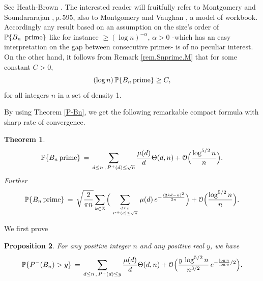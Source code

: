 \documentclass[11pt,draft,reqno]{amsart}
\newtheorem{theorem}{Theorem}[section]
\newtheorem{proposition}[theorem]{Proposition}
\theoremstyle{definition}
\theoremstyle{remarks}
\numberwithin{equation}{section}
\def \a{{\alpha}}
\def \b{{\beta}}
\def \g{{\gamma}}
\def \m{{\mu}}
\def\P{{\mathcal P}}
\def\P{{\mathbb P}}
\def\Z{{\mathbb Z}}
\begin{document}
See Heath-Brown \cite{HB}.
The interested reader will fruitfully refer to Montgomery and Soundararajan \cite{MS},\,p.\,595, also to Montgomery and Vaughan \cite{MV}, a model of   workbook. Accordingly any  result based on an assumption on the size's order of $\P\{ B_n\,\hbox{  prime} \}$ like for instance $\ge ( \log n)^{-\a}$, $\a>0$  -which has an easy interpretation on the gap between consecutive primes- is of no peculiar interest.
\vskip 3pt On the other hand, it follows from Remark \ref{rem.Snprime.M}   that  for some constant $C>0$,
\begin{equation}\label{bd1}(\log n) \, \P\{ B_n\,\hbox{prime} \}\ge C,
\end{equation}
for all   integers $n$ in a  set  of density 1.  \bigskip \par
  
  
  
 By using Theorem \ref{P-Bn}, we get  the following remarkable compact formula with sharp rate of convergence. 
\begin{theorem}\label{eta(n;y)Bprime}
 \begin{equation*}\P\{ B_n\,\hbox{\rm prime} \} \,=\,  \sum_{d\le n\,,\,  P^+(d )\le \sqrt n}{  \m(d)\over d}\Theta(d,n)+ {\mathcal O}\Big({ \log^{5/2} n  \over n}\Big).\end{equation*} 
 Further
\begin{equation*}\P\{ B_n\,\hbox{\rm prime} \} \,=\, \sqrt{  { 2\over \pi
n}}  \sum_{ k\in\Z}  \Big( \sum_{d\le n\atop  P^+(d )\le \sqrt n}   \m(d) \,e^{-{ (2kd-n)^2\over 2 n}}\Big)+ {\mathcal O}\Big({ \log^{5/2} n  \over n}\Big).\end{equation*} 
\end{theorem}  
We first prove
\begin{proposition} \label{p.eta(n;y)B}  For any positive integer $n$ and any positive real $y$,
 we have 
  \begin{equation}\label{eta(n;y)B.est}\P\{P^-(B_n )> y\} \,=\,  \sum_{ d\le n\,,\, P^+(d )\le y}{  \m(d)\over d}\Theta(d,n)+ {\mathcal O}\Big( { y\,\log^{5/2} n  \over n^{ 3/2}}\, 
e^{-\frac{\log n}{\log y}/2 }
\Big).
\end{equation} 
  \end{proposition}
 
\end{document}
